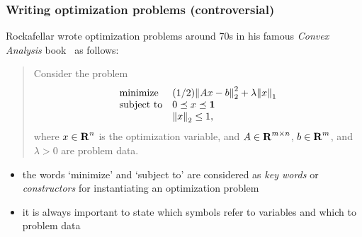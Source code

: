 \documentclass[usepdftitle=false]{beamer}
\begin{document}
\begin{frame}
    \frametitle{Writing optimization problems (controversial)}

    Rockafellar wrote optimization problems around 70s in his famous \emph{Convex Analysis} book~\cite{rockafellar1970convex} as follows:
    \begin{quote}
        Consider the problem
        \begin{equation}\label{prob:opt}
            \begin{array}{ll}
                \mbox{minimize}   & (1/2){\lVert Ax-b \rVert}_2^2 + \lambda {\lVert x \rVert}_1 \\
                \mbox{subject to} & 0 \preceq x \preceq \mathbf{1} \\
                & {\lVert x \rVert}_2 \leq 1,
            \end{array}
        \end{equation}
        where $x \in {\bf R{}}^n$ is the optimization variable, and $A \in {\bf R{}}^{m \times n}$, $b \in {\bf R{}}^m$, and $\lambda > 0$ are problem data.
    \end{quote}
    \begin{itemize}\itemsep=12pt
        \item the words `minimize' and `subject to' are considered as \emph{key words} or \emph{constructors} for instantiating an optimization problem
        \item it is always important to state which symbols refer to variables and which to problem data
    \end{itemize}
\end{frame}
\end{document}
